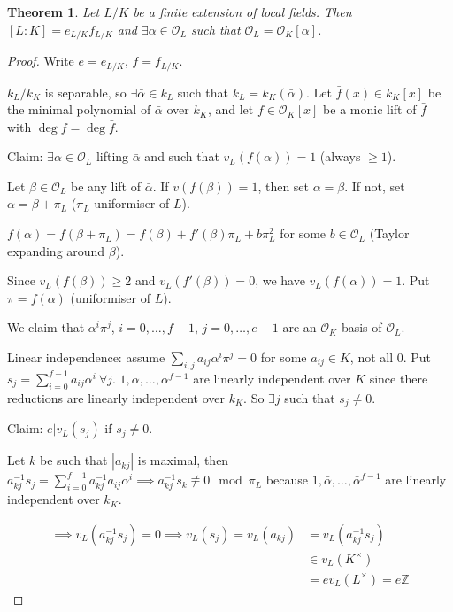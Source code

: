 \documentclass[a4paper]{article}
\newtheorem{theorem}[definition]{Theorem}
\newcommand*\abs[1]{\left|#1\right|}
\begin{document}
\begin{theorem}
	Let $L/K$ be a finite extension of local fields.
	Then $[L:K] = e_{L/K}f_{L/K}$ and $\exists \alpha \in \mathcal{O}_L$ such that $\mathcal{O}_L = \mathcal{O}_K[\alpha]$.
	\label{70}
\end{theorem}
\begin{proof}
	Write $e=e_{L/K}$, $f=f_{L/K}$.
	
	$k_L/k_K$ is separable,
	so $\exists \bar{\alpha} \in k_L$ such that $k_L = k_K(\bar{\alpha})$.
	Let $\bar{f}(x) \in k_K[x]$ be the minimal polynomial of $\bar{\alpha}$ over $k_K$,
	and let $f \in \mathcal{O}_K[x]$ be a monic lift of $\bar{f}$ with $\deg f = \deg \bar{f}$.
	
	Claim: $\exists \alpha \in \mathcal{O}_L$ lifting $\bar{\alpha}$ and such that $v_L(f(\alpha)) = 1$ (always $\geq 1$).
	
	Let $\beta \in \mathcal{O}_L$ be any lift of $\bar{\alpha}$.
	If $v(f(\beta)) = 1$, then set $\alpha = \beta$.
	If not, set $\alpha = \beta + \pi_L$ ($\pi_L$ uniformiser of $L$).
	
	$f(\alpha) = f(\beta+ \pi_L) = f(\beta)+f'(\beta)\pi_L + b \pi_L^2$ for some $b \in \mathcal{O}_L$ (Taylor expanding around $\beta$).
	
	Since $v_L(f(\beta)) \geq 2$ and $v_L(f'(\beta)) = 0$,
	we have $v_L(f(\alpha)) = 1$.
	Put $\pi = f(\alpha)$ (uniformiser of $L$).
	
	We claim that $\alpha^i\pi^j$,
	$i=0,\dots,f-1$, $j=0,\dots,e-1$ are an $\mathcal{O}_K$-basis of $\mathcal{O}_L$.
	
	Linear independence: assume $\sum_{i,j}a_{ij}\alpha^i\pi^j=0$ for some $a_{ij} \in K$, not all 0.
	Put $s_j = \sum_{i=0}^{f-1}a_{ij}\alpha^i\ \forall j$.
	$1, \alpha, \dots, \alpha^{f-1}$ are linearly independent over $K$ since there reductions are linearly independent over $k_K$.
	So $\exists j$ such that $s_j \neq 0$.
	
	Claim: $e | v_L(s_j)$ if $s_j \neq 0$.
	
	Let $k$ be such that $\abs{a_{kj}}$ is maximal,
	then $a_{kj}^{-1}s_j = \sum_{i=0}^{f-1}a_{kj}^{-1}a_{ij}\alpha^i \implies a_{kj}^{-1}s_k \not\equiv 0 \mod \pi_L$
	because $1, \bar{\alpha}, \dots, \bar{\alpha}^{f-1}$ are linearly independent over $k_K$.
	
	\begin{align*}
		\implies v_L(a_{kj}^{-1}s_j) = 0 \implies v_L(s_j) = v_L(a_{kj}) &= v_L(a_{kj}^{-1}s_j) \\
		&\in v_L(K^\times) \\
		&= ev_L(L^\times) = e\mathbb{Z}
	\end{align*}
	

\end{proof}
\end{document}
